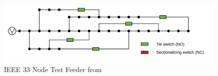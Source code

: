 \begin{figure}
    \centering
    \includegraphics[scale=0.4]{_chapter2/fig/33bus_tc.pdf}
    \caption{IEEE 33 Node Test Feeder from \cite{Landeros2019}}
    \label{ch2:fig:33bus}
\end{figure}